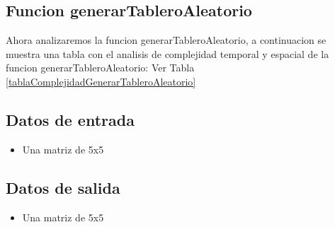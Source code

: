 \documentclass[10pt,twocolumn]{article}
\begin{document}







\subsection{Funcion generarTableroAleatorio}

Ahora analizaremos la funcion generarTableroAleatorio, a continuacion se muestra una tabla con el analisis de complejidad temporal y espacial de la funcion generarTableroAleatorio:
Ver Tabla \ref{tablaComplejidadGenerarTableroAleatorio}

\subsection{Datos de entrada}
\begin{itemize}
\item Una matriz de 5x5
\end{itemize}

\subsection{Datos de salida}
\begin{itemize}
\item Una matriz de 5x5
\end{itemize}
\end{document}

